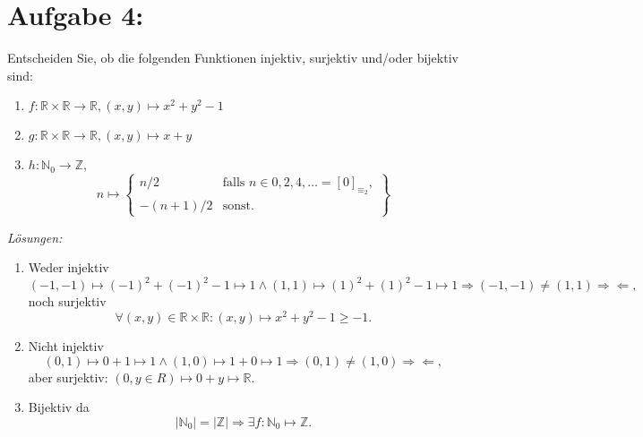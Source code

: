 \documentclass{exam}
\begin{document}
\pagebreak

\section*{Aufgabe 4:}
Entscheiden Sie, ob die folgenden Funktionen injektiv, surjektiv und/oder bijektiv sind:
\begin{enumerate}[label=\roman*)]
    \item $f: \mathbb{R} \times \mathbb{R} \rightarrow \mathbb{R}, (x,y) \mapsto x^2 + y^2 -1$
    \item $g: \mathbb{R} \times \mathbb{R} \rightarrow \mathbb{R}, (x,y) \mapsto x + y$
    \item $h: \mathbb{N}_0 \rightarrow \mathbb{Z}$, \[
              n \mapsto \left\{
              \begin{array}{ll}
                  n/2      & \text{falls } n \in {0,2,4, \dots} = [0]_{\equiv_2}, \\
                  -(n+1)/2 & \text{sonst}.
              \end{array}
              \right\}
          \]
\end{enumerate}
\textit{Lösungen:}
\begin{enumerate}[label=\roman*)]
    \item Weder injektiv \[
              (-1,-1) \mapsto {(-1)}^2 + {(-1)}^2 - 1 \mapsto 1
              \land
              (1,1) \mapsto {(1)}^2 + {(1)}^2 - 1 \mapsto 1
              \Rightarrow
              (-1,-1) \not = (1,1)
              \Rightarrow\Leftarrow,
          \] noch surjektiv \[
              \forall (x,y) \in \mathbb{R} \times \mathbb{R}: (x,y) \mapsto x^2 + y^2 -1 \ge -1.
          \]
    \item Nicht injektiv \[
              (0,1) \mapsto 0 + 1 \mapsto 1
              \land
              (1,0) \mapsto 1 + 0 \mapsto 1
              \Rightarrow
              (0,1) \not = (1,0)
              \Rightarrow\Leftarrow,
          \] aber surjektiv: $(0, y \in R) \mapsto 0 + y \mapsto \mathbb{R}$.
    \item Bijektiv da \[
              \lvert \mathbb{N}_0 \lvert = \lvert \mathbb{Z} \lvert \Rightarrow \exists f: \mathbb{N}_0 \mapsto \mathbb{Z}.
          \]
\end{enumerate}
\end{document}
